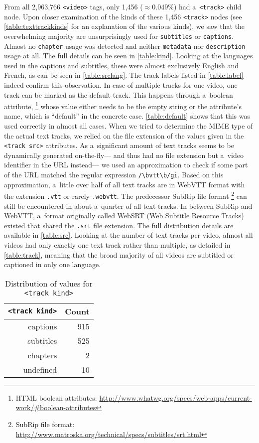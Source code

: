 \documentclass{sig-alternate-ceur}
\newcommand{\inlinelistingsize}{\fontsize{8pt}{11pt}}
\let\oldurl\url
\renewcommand{\url}[1]{\inlinelistingsize\oldurl{#1}}
\begin{document}
From all 2,963,766 \texttt{<video>} tags,
only 1,456 (${\approx0.049\%}$) had a~\texttt{<track>} child node.
Upon closer examination of the kinds of these 1,456 \texttt{<track>} nodes
(see \autoref{table:texttrackkinds} for an explanation of the various kinds),
we saw that the overwhelming majority are unsurprisingly
used for \texttt{subtitles} or \texttt{captions}.
Almost no \texttt{chapter} usage was detected
and neither \texttt{metadata} nor \texttt{description} usage at all.
The full details can be seen in \autoref{table:kind}.
Looking at the languages used in the captions and subtitles, 
these were almost exclusively English and French,
as can be seen in \autoref{table:srclang}.
The track labels listed in \autoref{table:label}
indeed confirm this observation.
In case of multiple tracks for one video,
one track can be marked as the default track.
This happens through a~boolean attribute,%
\footnote{HTML boolean attributes:
\url{http://www.whatwg.org/specs/web-apps/current-work/\#boolean-attributes}}
whose value either needs to be the empty string
or the attribute's name,
which is ``default'' in the concrete case.
\autoref{table:default}
shows that this was used correctly in almost all cases.
When we tried to determine the MIME type of the actual
text tracks, we relied on the file extension
of the values given in the \texttt{<track src>} attributes.
As a~significant amount of text tracks
seems to be dynamically generated on-the-fly---%
and thus had no file extension but a~video identifier in the URL instead---%
we used an approximation to check if some part
of the URL matched the regular expression \texttt{/\textbackslash bvtt\textbackslash b/gi}.
Based on this approximation,
a~little over half of all text tracks
are in WebVTT format
with the extension \texttt{.vtt}
or rarely \texttt{.webvtt}.
The predecessor SubRip file format%
\footnote{SubRip file format:
\url{http://www.matroska.org/technical/specs/subtitles/srt.html}}
can still be encountered in about
a~quarter of all text tracks.
In between SubRip and WebVTT, a~format originally called WebSRT
(Web Subtitle Resource Tracks) existed
that shared the \texttt{.srt} file extension.
The full distribution details are available in \autoref{table:src}.
Looking at the number of text tracks per video,
almost all videos had only exactly one text track
rather than multiple, as detailed in \autoref{table:track},
meaning that the broad majority of all videos are subtitled or captioned
in only one language.\vfill

\begin{table}[b!]
  \raggedleft
  \footnotesize
  \begin{tabular}{ r | r }                       
    \texttt{<track kind>} & Count \\
    \hline  
    captions & 915\\
    subtitles & 525\\
    chapters & 2\\
    undefined & 10\\  
  \end{tabular}
  \caption{Distribution of values for
    \texttt{<track kind>}}
  \label{table:kind}
\end{table}
\end{document}
